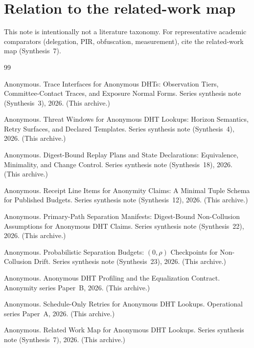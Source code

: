 \documentclass[11pt]{article}
\begin{document}
\section{Relation to the related-work map}
This note is intentionally not a literature taxonomy.
For representative academic comparators (delegation, PIR, obfuscation, measurement), cite the related-work map (Synthesis~7).\cite{series:relatedworkmap}

\begin{thebibliography}{99}\small

Anonymous.
\newblock Trace Interfaces for Anonymous DHTs: Observation Tiers, Committee-Contact Traces, and Exposure Normal Forms.
\newblock Series synthesis note (Synthesis~3), 2026. (This archive.)

Anonymous.
\newblock Threat Windows for Anonymous DHT Lookups: Horizon Semantics, Retry Surfaces, and Declared Templates.
\newblock Series synthesis note (Synthesis~4), 2026. (This archive.)

Anonymous.
\newblock Digest-Bound Replay Plans and State Declarations: Equivalence, Minimality, and Change Control.
\newblock Series synthesis note (Synthesis~18), 2026. (This archive.)

Anonymous.
\newblock Receipt Line Items for Anonymity Claims: A Minimal Tuple Schema for Published Budgets.
\newblock Series synthesis note (Synthesis~12), 2026. (This archive.)

Anonymous.
\newblock Primary-Path Separation Manifests: Digest-Bound Non-Collusion Assumptions for Anonymous DHT Claims.
\newblock Series synthesis note (Synthesis~22), 2026. (This archive.)

Anonymous.
\newblock Probabilistic Separation Budgets: $(0,\rho)$ Checkpoints for Non-Collusion Drift.
\newblock Series synthesis note (Synthesis~23), 2026. (This archive.)

Anonymous.
\newblock Anonymous DHT Profiling and the Equalization Contract.
\newblock Anonymity series Paper~B, 2026. (This archive.)

Anonymous.
\newblock Schedule-Only Retries for Anonymous DHT Lookups.
\newblock Operational series Paper~A, 2026. (This archive.)

Anonymous.
\newblock Related Work Map for Anonymous DHT Lookups.
\newblock Series synthesis note (Synthesis~7), 2026. (This archive.)


\end{thebibliography}
\end{document}
